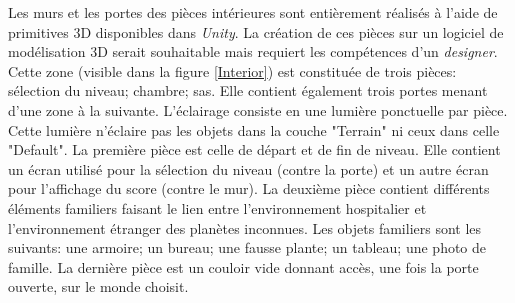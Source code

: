 		Les murs et les portes des pièces intérieures sont entièrement réalisés à l'aide de primitives 3D disponibles dans \textit{Unity}. La création de ces pièces sur un logiciel de modélisation 3D serait souhaitable mais requiert les compétences d'un \textit{designer}. Cette zone (visible dans la figure \ref{Interior}) est constituée de trois pièces: sélection du niveau; chambre; sas. Elle contient également trois portes menant d'une zone à la suivante. L'éclairage consiste en une lumière ponctuelle par pièce. Cette lumière n'éclaire pas les objets dans la couche "Terrain" ni ceux dans celle "Default". La première pièce est celle de départ et de fin de niveau. Elle contient un écran utilisé pour la sélection du niveau (contre la porte) et un autre écran pour l'affichage du score (contre le mur). La deuxième pièce contient différents éléments familiers faisant le lien entre l'environnement hospitalier et l'environnement étranger des planètes inconnues. Les objets familiers sont les suivants: une armoire; un bureau; une fausse plante; un tableau; une photo de famille. La dernière pièce est un couloir vide donnant accès, une fois la porte ouverte, sur le monde choisit.\medskip
		
		\begin{minipage}{\linewidth}
			\label{Interior}
		\end{minipage}\medskip
		\\
		
